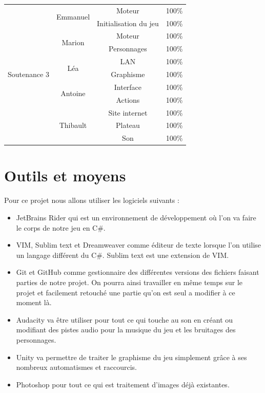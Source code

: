 \documentclass[12pt]{extarticle}
\begin{document}
\begin{table}[!ht]
\begin{center}
\begin{tabular}{ | c | c | c | c | }
			\multirow{11}{*}{Soutenance 3} & \multirow{2}{*}{Emmanuel} & Moteur & 100\% \\ \cline{3-4}
			&& Initialisation du jeu & 100\% \\ \cline{2-4}
			& \multirow{2}{*}{Marion} & Moteur & 100\% \\ \cline{3-4}
			&& Personnages & 100\% \\ \cline{2-4}
			& \multirow{2}{*}{Léa} & LAN & 100\% \\ \cline{3-4}
			&& Graphisme & 100\% \\ \cline{2-4}
			& \multirow{2}{*}{Antoine} & Interface & 100\% \\ \cline{3-4}
			&& Actions & 100\% \\ \cline{2-4}
			& \multirow{3}{*}{Thibault} & Site internet & 100\% \\ \cline{3-4}
			&& Plateau & 100\% \\ \cline{3-4}
			&& Son & 100\% \\ \hline
		\end{tabular}
	\end{center}
\end{table}

\section{Outils et moyens}

Pour ce projet nous allons utiliser les logiciels suivants :
\begin{itemize}[label=\textbullet]
	\item JetBrains Rider qui est un environnement de développement où l'on va faire le corps de notre jeu en C\#.
	\item VIM, Sublim text et Dreamweaver comme éditeur de texte lorsque l'on utilise un langage différent du C\#. Sublim text est une extension de VIM.
	\item Git et GitHub comme gestionnaire des différentes versions des fichiers faisant parties de notre projet. On pourra ainsi travailler en même temps sur le projet et facilement retouché une partie qu'on est seul a modifier à ce moment là.
	\item Audacity va être utiliser pour tout ce qui touche au son en créant ou modifiant des pistes audio pour la musique du jeu et les bruitages des personnages.
	\item Unity va permettre de traiter le graphisme du jeu simplement grâce à ses nombreux automatismes et raccourcis.
	\item Photoshop pour tout ce qui est traitement d'images déjà existantes.
\end{itemize}
\end{document}
